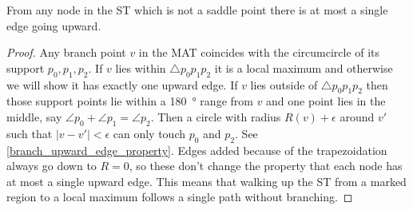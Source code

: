 \begin{lemma}\label{single_upward_edge}
From any node in the ST which is not a saddle point there is at most a single edge going upward.
\end{lemma}
\begin{proof}
Any branch point $v$ in the MAT coincides with the circumcircle of its support $p_0, p_1, p_2$.
If $v$ lies within $\triangle p_0 p_1 p_2$ it is a local maximum and otherwise we will show it has exactly one upward edge.
If $v$ lies outside of $\triangle p_0 p_1 p_2$ then those support points lie within a \SI{180}{\degree} range from $v$
and one point lies in the middle, say $\angle p_0 + \angle p_1 = \angle p_2$.
Then a circle with radius $R(v) + \epsilon$ around $v'$ such that $|v-v'| < \epsilon$ can only touch $p_0$ and $p_2$.
See \cref{branch_upward_edge_property}.
Edges added because of the trapezoidation always go down to $R=0$, so these don't change the property that each node has at most a single upward edge.
This means that walking up the ST from a marked region to a local maximum follows a single path without branching.
\end{proof}

\fi

